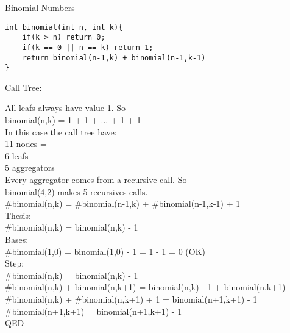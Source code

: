 \documentclass{article}
\begin{document}
Binomial Numbers

\lstset{language=C}
\begin{lstlisting}[frame=single]
int binomial(int n, int k){
	if(k > n) return 0;
	if(k == 0 || n == k) return 1;
	return binomial(n-1,k) + binomial(n-1,k-1)
}
\end{lstlisting}

Call Tree:


All leafs always have value 1. So\\ 
binomial(n,k) = 1 + 1 + ... + 1 + 1\\
In this case the call tree have:\\
11 nodes = \\
6 leafs\\
5 aggregators\\

Every aggregator comes from a recursive call. So\\
binomial(4,2) makes 5 recursives calls.\\

\#binomial(n,k) = \#binomial(n-1,k) + \#binomial(n-1,k-1) + 1\\

Thesis:\\
\#binomial(n,k) = binomial(n,k) - 1\\

Bases:\\
\#binomial(1,0) = binomial(1,0) - 1 = 1 - 1 = 0 (OK)\\

Step:\\
\#binomial(n,k) = binomial(n,k) - 1\\
\#binomial(n,k) + binomial(n,k+1) = binomial(n,k) - 1 + binomial(n,k+1)\\
\#binomial(n,k) + \#binomial(n,k+1) + 1 = binomial(n+1,k+1) - 1\\
\#binomial(n+1,k+1) = binomial(n+1,k+1) - 1\\
QED\\
\end{document}
